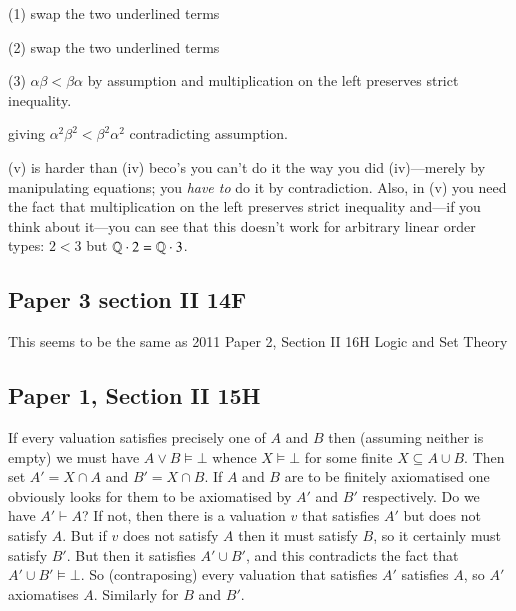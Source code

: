 \documentclass{book}
\begin{document}
(1) swap the two underlined terms

(2) swap the two underlined terms

(3) $\alpha\beta < \beta\alpha$ by assumption and multiplication on the left preserves strict inequality.

giving $\alpha^2\beta^2 < \beta^2\alpha^2$ contradicting assumption.


\medskip

(v) is harder than (iv) beco's you can't do it the way you did
(iv)---merely by manipulating equations; you {\sl have to} do it by
contradiction.  Also, in (v) you need the fact that multiplication on
the left preserves strict inequality and---if you think about it---you
can see that this doesn't work for arbitrary linear order types:
$2 <3$ but $\mathbb{Q}\cdot 2 = \mathbb{Q}\cdot 3$.
  


\subsection*{Paper 3 section II 14F}


This seems to be the same as 2011 Paper 2, Section II 16H Logic and Set Theory


\subsection*{Paper 1, Section II 15H}

If every valuation satisfies precisely one of $A$ and $B$ then
(assuming neither is empty) we must have $A \vee B \models \bot$
whence $X \models \bot$ for some finite $X \subseteq A \cup B$.  Then
set $A' = X \cap A$ and $B' = X \cap B$.  If $A$ and $B$ are to be
finitely axiomatised one obviously looks for them to be axiomatised by
$A'$ and $B'$ respectively.  Do we have $A' \vdash A$?  If not, then
there is a valuation $v$ that satisfies $A'$ but does not satisfy $A$.
But if $v$ does not satisfy $A$ then it must satisfy $B$, so it
certainly must satisfy $B'$.  But then it satisfies $A' \cup B'$, and
this contradicts the fact that $A' \cup B' \models \bot$.  So
(contraposing) every valuation that satisfies $A'$ satisfies $A$, so
$A'$ axiomatises $A$.  Similarly for $B$ and $B'$.
\end{document}
